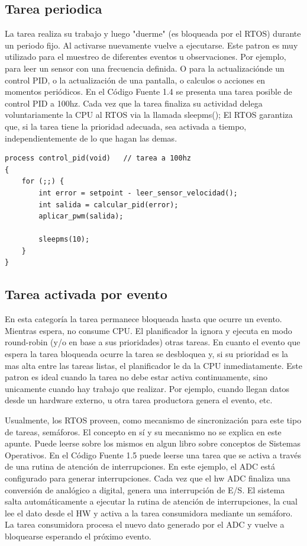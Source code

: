\documentclass[output=paper, 
colorlinks,
citecolor=brown,
newtxmath
]{langscibook}
\begin{document}
\subsection{Tarea periodica }
La tarea realiza su trabajo y luego "duerme" (es bloqueada por el RTOS) durante
un periodo fijo. Al activarse nuevamente vuelve a ejecutarse. Este patron es 
muy utilizado para el muestreo de diferentes eventos u observaciones.
Por ejemplo, para leer un sensor con una frecuencia definida. O para la actualizaciónde un control PID, o la actualización de una pantalla, o calculos
o acciones en momentos periódicos. En el Código Fuente 1.4 se presenta una
tarea posible de control PID a 100hz. Cada vez que la tarea finaliza
su actividad delega voluntariamente la CPU al RTOS via la llamada sleepms();
El RTOS garantiza que, si la tarea tiene la prioridad adecuada, sea 
activada a tiempo, independientemente de lo que hagan las demas.

\begin{lstlisting}[caption={Ejemplo de una tarea periódica}, frame=single ]
process control_pid(void)   // tarea a 100hz
{
    for (;;) {
        int error = setpoint - leer_sensor_velocidad();
        int salida = calcular_pid(error);
        aplicar_pwm(salida);

        sleepms(10);
    }
}
\end{lstlisting}

\subsection{Tarea activada por evento}

En esta categoría la tarea permanece bloqueada hasta que ocurre un evento.
Mientras espera, no consume CPU. El planificador la ignora y ejecuta en 
modo round-robin (y/o en base a sus prioridades) otras tareas. 
En cuanto el evento que espera la tarea bloqueada ocurre
la tarea se desbloquea y, si su prioridad es la mas alta entre 
las tareas listas, el planificador le da la CPU inmediatamente.
Este patron es ideal cuando la tarea no debe estar activa continuamente, 
sino unicamente cuando hay trabajo que realizar. Por ejemplo, 
cuando llegan datos desde un hardware externo, u otra tarea productora
genera el evento, etc.

Usualmente, los RTOS proveen, como mecanismo de sincronización para este
tipo de tareas, semáforos. El concepto en sí y su mecanismo no se explica
en este apunte. Puede leerse sobre los mismos en algun libro sobre
conceptos de Sistemas Operativos. En el Código Fuente 1.5 puede leerse
una tarea que se activa a través de una rutina de atención de interrupciones.
En este ejemplo, el ADC está configurado para generar interrupciones.
Cada vez que el hw ADC finaliza una conversión de analógico a digital,
genera una interrupción de E/S. El sistema salta automáticamente a ejecutar
la rutina de atención de interrupciones, la cual lee el dato desde el HW
y activa a la tarea consumidora mediante un semáforo. La tarea consumidora
procesa el nuevo dato generado por el ADC y vuelve a bloquearse esperando
el próximo evento.
\end{document}
